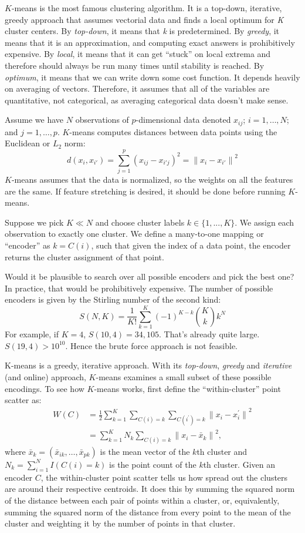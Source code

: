 \documentclass[a4paper]{article}
\begin{document}
$K$-means is the most famous clustering algorithm.  
It is a top-down, iterative, greedy approach that assumes vectorial data and finds a local optimum for \emph{K} cluster centers.  By \emph{top-down}, it means that \emph{k} is predetermined. By \emph{greedy}, it means that it is an approximation, and computing exact answers is prohibitively expensive. By \emph{local}, it means that it can get ``stuck'' on local extrema and therefore should always be run many times until stability is reached. By \emph{optimum}, it means that we can write down some cost function.
It depends heavily on averaging of vectors.  
Therefore, it assumes that all of the variables are quantitative, not categorical, as averaging categorical data doesn't make sense.

Assume we have $N$ observations of $p$-dimensional data denoted $x_{ij}$; $i=1,\ldots,N$; and $j=1,\ldots,p$.
$K$-means computes distances between data points using the Euclidean or $L_2$ norm:
$$
d(x_i, x_{i'}) = \sum_{j=1}^{p} (x_{ij} - x_{i\prime j})^2 = {\| x_i - x_{i'} \|}^2
$$
$K$-means assumes that the data is normalized, so the weights on all the features are the same. If feature stretching is desired, it should be done before running $K$-means.

Suppose we pick $K\ll N$ and choose cluster labels $k \in \{1, ..., K\}$.  
We assign each observation to exactly one cluster.  
We define a many-to-one mapping or ``encoder'' as $k=C(i)$, such that given the index of a data point, the encoder returns the cluster assignment of that point.

Would it be plausible to search over all possible encoders and pick the best one?  
In practice, that would be prohibitively expensive. 
The number of possible encoders is given by the Stirling number of the second kind:
$$
S(N,K) = \frac{1}{K!} \sum_{k=1}^{K} (-1)^{K-k} \binom Kk k^N
$$
For example, if $K=4$,
$S(10,4) = 34,105$.  
That's already quite large.  
$S(19,4) > 10^{10}$.  
Hence the brute force approach is not feasible.

K-means is a greedy, iterative approach. With its \emph{top-down}, \emph{greedy} and  \emph{iterative} (and online) approach, $K$-means examines a small subset of these possible encodings.  
To see how $K$-means works, first define the ``within-cluster'' point scatter as:
\begin{align*}
W(C) &= \frac{1}{2} \sum_{k=1}^{K}\sum_{C(i)=k}\sum_{C(i^\prime)=k} {\| x_i - x_i^\prime \|}^2 \\
&= \sum_{k=1}^{K} N_k \sum_{C(i) = k} {\| x_i - {\bar x_k} \|} ^2,
\end{align*}
where ${\bar x_k} = ({\bar x_{ik}}, \ldots, {\bar x_{pk}})$ is the mean vector of the $k$th cluster and $N_k = \sum_{i=1}^{N} I(C(i) = k)$ is the point count of the $k$th cluster.  
Given an encoder $C$, the within-cluster point scatter tells us how spread out the clusters are around their respective centroids. 
It does this by summing the squared norm of the distance between each pair of points within a cluster, or, equivalently, summing the squared norm of the distance from every point to the mean of the cluster and weighting it by the number of points in that cluster.
\end{document}
